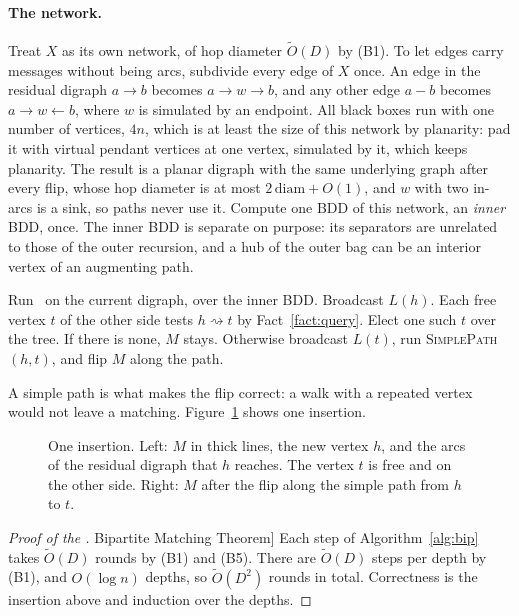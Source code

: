 \documentclass[11pt]{article}
\theoremstyle{definition}
\theoremstyle{remark}
\theoremstyle{plain}
\newcommand{\ThmBip}{\hyperref[thm:bip]{Bipartite Matching Theorem}}
\newcommand{\AlgPath}{\textsc{SimplePath}}
\newcommand{\AlgBip}{\textsc{InsertHub}}
\newcommand{\Ot}{\tilde O}
\newcommand{\reach}{\rightsquigarrow}
\begin{document}
\paragraph{The network.} Treat $X$ as its own network, of hop diameter $\Ot(D)$ by (B1). To let edges carry messages without being arcs, subdivide every edge of $X$ once. An
edge in the residual digraph $a\to b$ becomes $a\to w\to b$, and any other edge $a-b$ becomes $a\to w\leftarrow b$,
where $w$ is simulated by an endpoint. All black boxes run with one number of vertices, $4n$, which is at least the size of
this network by planarity: pad it with virtual pendant vertices at one vertex, simulated by it, which keeps planarity. The result is a
planar digraph with the same underlying graph after every flip, whose hop diameter is at most $2\,\mathrm{diam}+O(1)$, and $w$ with two in-arcs is a sink, so paths never use it. Compute one BDD
of this network, an \emph{inner} BDD, once. The inner BDD is separate on purpose: its separators are unrelated to
those of the outer recursion, and a hub of the outer bag can be an interior vertex of an augmenting path.

\begin{algorithm}[t]
\caption{\AlgBip{}, for one bag $X$ and one new vertex $h$}\label{alg:bip}
\begin{algorithmic}[1]
\State Run~\cite[Lemma 16]{P20} on the current digraph, over the inner BDD.
\State Broadcast $L(h)$. Each free vertex $t$ of the other side tests $h\reach t$ by Fact~\ref{fact:query}.
\State Elect one such $t$ over the tree. If there is none, $M$ stays.
\State Otherwise broadcast $L(t)$, run \AlgPath{}$(h,t)$, and flip $M$ along the path.
\end{algorithmic}
\end{algorithm}

A simple path is what makes the flip correct: a walk with a repeated vertex would not leave a matching.
Figure~\ref{fig:insertion} shows one insertion.

\begin{figure}[t]
\centering

\caption{One insertion. Left: $M$ in thick lines, the new vertex $h$, and the arcs of the residual digraph that $h$
reaches. The vertex $t$ is free and on the other side. Right: $M$ after the flip along the simple path from $h$ to $t$.}
\label{fig:insertion}
\end{figure}

\begin{proof}[Proof of the \ThmBip{}]
Each step of Algorithm~\ref{alg:bip} takes $\Ot(D)$ rounds by (B1) and (B5). There are $\Ot(D)$ steps per depth by (B1), and
$O(\log n)$ depths, so $\Ot(D^2)$ rounds in total. Correctness is the insertion above and induction over the depths.
\end{proof}
\end{document}
